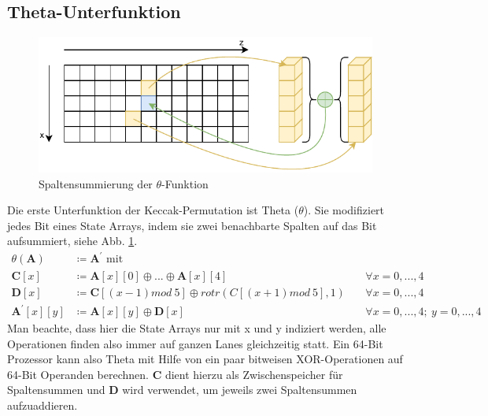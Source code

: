 \subsection{Theta-Unterfunktion}
\begin{figure}
    \center
    \includegraphics{images/theta.pdf}
    \caption{Spaltensummierung der $\theta$-Funktion}
    \label{fig:definition_theta}
\end{figure}
Die erste Unterfunktion der Keccak-Permutation ist Theta ($\theta$). Sie modifiziert jedes Bit eines State Arrays, indem sie zwei benachbarte Spalten auf das Bit aufsummiert, siehe Abb. \ref{fig:definition_theta}.
\begin{align*}
    \theta (\textbf{A}) & \coloneq \textbf{A}^\prime \text{ mit } \\
    \textbf{C}[x] & \coloneq \textbf{A}[x][0] \oplus ... \oplus \textbf{A}[x][4] && \forall x = 0,...,4 \\
    \textbf{D}[x] & \coloneq \textbf{C}[(x - 1) mod\ 5] \oplus rotr(C[(x + 1) mod\ 5], 1)\ && \forall x = 0,...,4 \\
    \textbf{A}^\prime[x][y] & \coloneq \textbf{A}[x][y] \oplus \textbf{D}[x]\ && \forall x = 0,...,4;\ y = 0,...,4
\end{align*}
Man beachte, dass hier die State Arrays nur mit x und y indiziert werden, alle Operationen finden also immer auf ganzen Lanes gleichzeitig statt.
Ein 64-Bit Prozessor kann also Theta mit Hilfe von ein paar bitweisen XOR-Operationen auf 64-Bit Operanden berechnen.
\textbf{C} dient hierzu als Zwischenspeicher für Spaltensummen und \textbf{D} wird verwendet, um jeweils zwei Spaltensummen aufzuaddieren.

